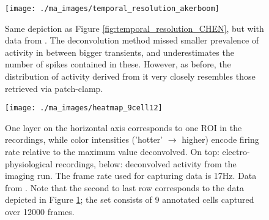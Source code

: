 \documentclass[titlepage]{article}
\begin{document}
\begin{figure}[h]
\centering
\texttt{[image: ./ma\_images/temporal\_resolution\_akerboom]}
\caption{Same depiction as Figure \ref{fig:temporal_resolution_CHEN}, but with data from \citeauthor{akerboom_optimization_2012}\cite{akerboom_optimization_2012}. The deconvolution method missed smaller prevalence of activity in between bigger transients, and underestimates the number of spikes contained in these. However, as before, the distribution of activity derived from it very closely resembles those retrieved via patch-clamp.}
\label{fig:temporal_resolution_akerboom}
\end{figure}

\begin{figure}[h]
\centering
\texttt{[image: ./ma\_images/heatmap\_9cell12]}
\caption{One layer on the horizontal axis corresponds to one ROI in the recordings, while color intensities ('hotter' $\rightarrow$ higher) encode firing rate relative to the maximum value deconvolved. On top: electro-physiological recordings, below: deconvolved activity from the imaging run. The frame rate used for capturing data is 17Hz\cite{akerboom_optimization_2012}. Data from \citeauthor{akerboom_optimization_2012}\cite{akerboom_optimization_2012}. Note that the second to last row corresponds to the data depicted in Figure \ref{fig:temporal_resolution_akerboom}; the set consists of 9 annotated cells captured over 12000 frames.}
\label{fig:heatmap_9cell12}
\end{figure}
\end{document}
